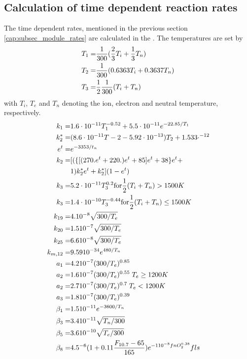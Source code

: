 \subsection{Calculation of time dependent reaction rates}\label{cap:subsec_tdep_rates}
%
The time dependent rates, mentioned in the previous section
\ref{cap:subsec_module_rates} are calculated in the . The temperatures are set by
%
\begin{align}
  T_1 = & \frac{1}{300} (\frac{2}{3} T_i + \frac{1}{3} T_n) \notag \\
  T_2 = & \frac{1}{300} (0.6363 T_i + 0.3637 T_n) \notag \\
  T_3 = & \frac{1}{2} \frac{1}{300}(T_i + T_n)
\end{align}
%
with $T_i$, $T_e$ and $T_n$ denoting the ion, electron and neutral
temperature, respectively.
%
\begin{align}
  k_1  = & 1.6 \cdot 10^{-11} T_1 ^{-0.52} + 5.5 \cdot 10^{-11}
      e^{-22.85/T_1} \\
  k_2^* = & (8.6 \cdot 10^{-11} T-2 - 5.92 \cdot 10^{-13}) T_2 + 1.533
      \cdot ^{-12} \\
  e^t = & e^{-3353/t_n} \notag \\
  k_2 = & [(\{ [( 270. e^t + 220.) e^t + 85] e^t + 38\} e^t + \notag \\
        & 1 ) k_2^* e^t + k_2^* ] (1-e^t) \\
  k_3 = & 5.2\cdot 10^{-11} T_3^{0.2} \text{for} \frac{1}{2}(T_i + T_n) > 1500K \notag \\
  k_3 = & 1.4\cdot 10^{-10} T_3^{-0.44} \text{for} \frac{1}{2}(T_i + T_n) \leq 1500K \\
  k_{19} = & 4. 10^{-8} \sqrt{300/T_e} \\
  k_{20} = & 1.5 10^{-7} \sqrt{300/T_e} \\
  k_{25} = & 6.6 10^{-8} \sqrt{300/T_e} \\
  k_{m,12} = & 9.59 10^{-34} e^{480/T_n} \\
  a_1 = & 4.2 10^{-7} (300/T_e)^{0.85} \\
  a_2 = & 1.6 10^{-7} (300/T_e)^{0.55} \; T_e \geq 1200 K \notag \\
  a_2 = & 2.7 10^{-7} (300/T_e)^{0.7} \; T_e < 1200 K \\
  a_3 = & 1.8 10^{-7} (300/T_e)^{0.39} \\
  \beta_1 = &1.5 10^{-11} e^{-3600/T_n} \\
  \beta_3 = &3.4 10^{-11} \sqrt{T_n/300} \\
  \beta_5 = &3.6 10^{-10} \sqrt{T_e/300} \\
 \beta_8 = & 4.5^{-6}(1 + 0.11 \frac{F_{10.7} -65}{165}) e^{-1
 10^{-8}fnO_2^{0.38}}fls
\end{align}
